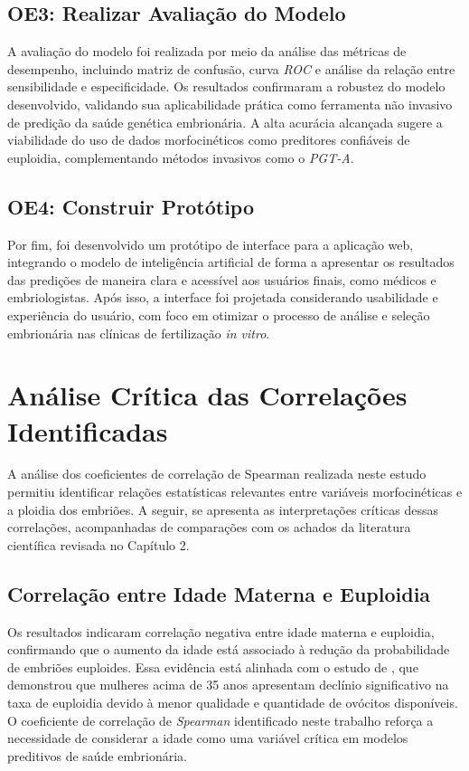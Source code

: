 \subsection{OE3: Realizar Avaliação do Modelo}
A avaliação do modelo foi realizada por meio da análise das métricas de desempenho, incluindo matriz de confusão, curva \textit{ROC} e análise da relação entre sensibilidade e especificidade. Os resultados confirmaram a robustez do modelo desenvolvido, validando sua aplicabilidade prática como ferramenta não invasivo de predição da saúde genética embrionária. A alta acurácia alcançada sugere a viabilidade do uso de dados morfocinéticos como preditores confiáveis de euploidia, complementando métodos invasivos como o \textit{PGT-A}.

\subsection{OE4: Construir Protótipo}
Por fim, foi desenvolvido um protótipo de interface para a aplicação web, integrando o modelo de inteligência artificial de forma a apresentar os resultados das predições de maneira clara e acessível aos usuários finais, como médicos e embriologistas. Após isso, a interface foi projetada considerando usabilidade e experiência do usuário, com foco em otimizar o processo de análise e seleção embrionária nas clínicas de fertilização \textit{in vitro}.

\section{Análise Crítica das Correlações Identificadas}
A análise dos coeficientes de correlação de Spearman realizada neste estudo permitiu identificar relações estatísticas relevantes entre variáveis morfocinéticas e a ploidia dos embriões. A seguir, se apresenta as interpretações críticas dessas correlações, acompanhadas de comparações com os achados da literatura científica revisada no Capítulo 2.

\subsection{Correlação entre Idade Materna e Euploidia}
Os resultados indicaram correlação negativa entre idade materna e euploidia, confirmando que o aumento da idade está associado à redução da probabilidade de embriões euploides. Essa evidência está alinhada com o estudo de , que demonstrou que mulheres acima de 35 anos apresentam declínio significativo na taxa de euploidia devido à menor qualidade e quantidade de ovócitos disponíveis. O coeficiente de correlação de \textit{Spearman} identificado neste trabalho reforça a necessidade de considerar a idade como uma variável crítica em modelos preditivos de saúde embrionária.

